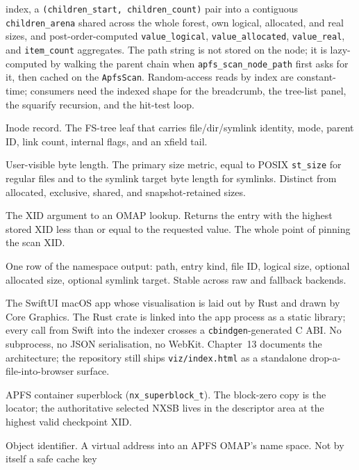 \begin{description}
    index, a \texttt{(children\_start, children\_count)} pair
    into a contiguous \texttt{children\_arena} shared across the
    whole forest, own logical, allocated, and real sizes, and
    post-order-computed \texttt{value\_logical},
    \texttt{value\_allocated}, \texttt{value\_real}, and
    \texttt{item\_count} aggregates. The path string is not stored on the node; it is
    lazy-computed by walking the parent chain when
    \texttt{apfs\_scan\_node\_path} first asks for it, then
    cached on the \texttt{ApfsScan}. Random-access reads by index
    are constant-time; consumers need the indexed shape for the
    breadcrumb, the tree-list panel, the squarify recursion, and
    the hit-test loop.
  \item[\texttt{INODE}.] Inode record. The FS-tree leaf that
    carries file/dir/symlink identity, mode, parent ID, link
    count, internal flags, and an xfield tail.
  \item[Logical size.] User-visible byte length. The primary
    size metric, equal to POSIX \texttt{st\_size} for regular
    files and to the symlink target byte length for symlinks.
    Distinct from allocated, exclusive, shared, and
    snapshot-retained sizes.
  \item[Max XID.] The XID argument to an OMAP lookup. Returns the
    entry with the highest stored XID less than or equal to the
    requested value. The whole point of pinning the scan XID.
  \item[\texttt{NamespaceEntry}.] One row of the namespace
    output: path, entry kind, file ID, logical size, optional
    allocated size, optional symlink target. Stable across raw
    and fallback backends.
  \item[Native shell.] The SwiftUI macOS app whose visualisation
    is laid out by Rust and drawn by Core Graphics. The Rust
    crate is linked into the app process as a static library;
    every call from Swift into the indexer crosses a
    \texttt{cbindgen}-generated C ABI. No subprocess, no JSON
    serialisation, no WebKit. Chapter~13 documents the
    architecture; the repository still ships
    \texttt{viz/index.html} as a standalone
    drop-a-file-into-browser surface.
  \item[NX / NXSB.] APFS container superblock
    (\texttt{nx\_superblock\_t}). The block-zero copy is the
    locator; the authoritative selected NXSB lives in the
    descriptor area at the highest valid checkpoint XID.
  \item[OID.] Object identifier. A virtual address into an APFS
    OMAP's name space. Not by itself a safe cache key

\end{description}

